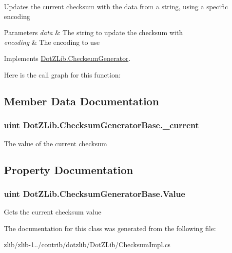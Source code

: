 Updates the current checksum with the data from a string, using a specific encoding 


\begin{DoxyParams}{Parameters}
{\em data} & The string to update the checksum with\\
\hline
{\em encoding} & The encoding to use\\
\hline
\end{DoxyParams}


Implements \hyperlink{interface_dot_z_lib_1_1_checksum_generator_ab894f35764ea30031c616517a6a00391}{Dot\+Z\+Lib.\+Checksum\+Generator}.



Here is the call graph for this function\+:




\subsection{Member Data Documentation}
\hypertarget{class_dot_z_lib_1_1_checksum_generator_base_ae7a9bb3eb75ea23a06dbaa4c52503f4a}{
\subsubsection[{\+\_\+current}]{\setlength{\rightskip}{0pt plus 5cm}uint Dot\+Z\+Lib.\+Checksum\+Generator\+Base.\+\_\+current\hspace{0.3cm}{\ttfamily [protected]}}}\label{class_dot_z_lib_1_1_checksum_generator_base_ae7a9bb3eb75ea23a06dbaa4c52503f4a}


The value of the current checksum 



\subsection{Property Documentation}
\hypertarget{class_dot_z_lib_1_1_checksum_generator_base_a06e5207da2126570dc70c6f7d43553e6}{
\subsubsection[{Value}]{\setlength{\rightskip}{0pt plus 5cm}uint Dot\+Z\+Lib.\+Checksum\+Generator\+Base.\+Value\hspace{0.3cm}{\ttfamily [get]}}}\label{class_dot_z_lib_1_1_checksum_generator_base_a06e5207da2126570dc70c6f7d43553e6}


Gets the current checksum value 



The documentation for this class was generated from the following file\+:\begin{DoxyCompactItemize}
\item 
zlib/zlib-\/1../contrib/dotzlib/\+Dot\+Z\+Lib/Checksum\+Impl.\+cs\end{DoxyCompactItemize}
